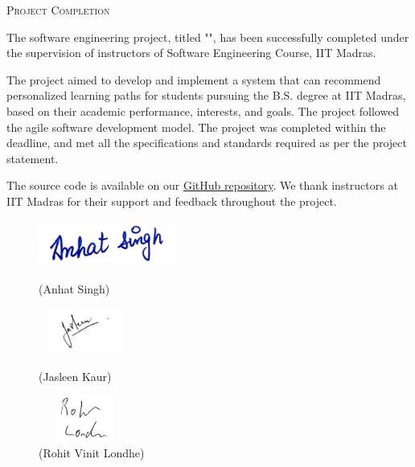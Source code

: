\begin{center}
{\fontsize{28}{0}\selectfont\scshape Project Completion}
\end{center}

\vspace{1in}

\vspace{-0.1in}\setlength\parindent{24pt}
\noindent The software engineering project, titled "\doctitle", has been successfully completed under the supervision of instructors of Software Engineering Course, IIT Madras.

The project aimed to develop and implement a system that can recommend personalized learning paths for students pursuing the B.S. degree at IIT Madras, based on their academic performance, interests, and goals. The project followed the agile software development model. The project was completed within the deadline, and met all the specifications and standards required as per the project statement.

The source code is available on our \href{https://github.com/anhatsingh/Software-Engineering-Project-IITM-Sept2023}{GitHub repository}. We thank instructors at IIT Madras for their support and feedback throughout the project.


\vspace{0.7in}

\begin{figure}[H]
\centering
\begin{minipage}{.3\textwidth}
    \centering        
    \includegraphics[height=1.5cm,width=4.5cm]{img/anhat.jpg}
    \caption*{(Anhat Singh)}
    \label{fig:anh_sign}
\end{minipage}%
\begin{minipage}{.3\textwidth}
    \centering        
    \includegraphics[height=1.5cm, width=3cm]{img/jasleen.jpg}
    \caption*{(Jasleen Kaur)}
    \label{fig:jas_sign}
\end{minipage}%
\begin{minipage}{.3\textwidth}
    \centering        
    \includegraphics[height=1.5cm, width=3cm]{img/rohit.png}
    \caption*{(Rohit Vinit Londhe)}
    \label{fig:rohit_sign}
\end{minipage}%
\end{figure}

